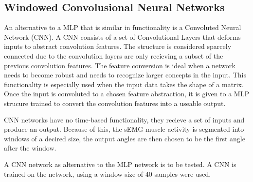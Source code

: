 \documentclass[../main.tex]{subfiles}
\begin{document}



\subsection{Windowed Convolusional Neural Networks}

An alternative to a MLP that is similar in functionality is a Convoluted Neural Network (CNN).
A CNN consists of a set of Convolutional Layers that deforms inputs to abstract convolution features.
The structure is considered sparcely connected due to the convolution layers are only recieving a subset of the previous convolution features.
The feature conversion is ideal when a network needs to become robust and needs to recognize larger concepts in the input.
This functionality is especially used when the input data takes the shape of a matrix.
Once the input is convoluted to a chosen feature abstraction, it is given to a MLP strucure trained to convert the convolution features into a useable output.

CNN networks have no time-based functionality, they recieve a set of inputs and produce an output.
Because of this, the sEMG muscle activity is segmented into windows of a decired size, the output angles are then chosen to be the first angle after the window.


A CNN network as alternative to the MLP network is to be tested.
A CNN is trained on the network, using a window size of 40 samples were used.
\end{document}
